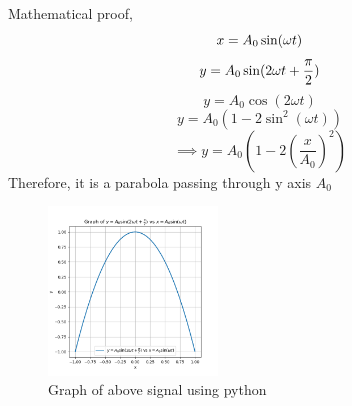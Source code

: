\begin{enumerate}
Mathematical proof,\\
\[
x = A_0 \sin(\omega t)\\
\]
\[
y = A_0 \sin(2\omega t+\frac{\pi}{2})\\
\]
\[
y= A_0 \cos(2\omega t)
\]
\[
y=A_0(1-2\sin^2(\omega t))
\]
\[
\implies y= A_0(1-2(\frac{x}{A_0})^2)
\]
Therefore, it is a parabola passing through y axis $A_0$
\begin{figure}[h!]
    \centering
    \includegraphics[width=0.4\textwidth]{graphs/Figure_5.png}
    \caption{Graph of above signal using python}
    \label{fig:sample_image}
     \end{figure}

\end{enumerate}